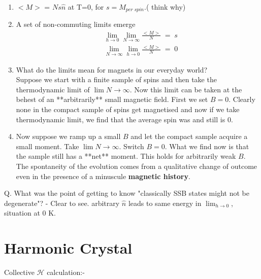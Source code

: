 \documentclass[12pt]{article}
\begin{document}
\begin{enumerate}
    \item  $<M>$ = $Ns\hat{n}$ at T=0, for $s= M_{per\;spin}$.( think why)
    \item  A set of non-commuting limits emerge
        \begin{align*}
              &\lim_{h\to 0}\lim_{N\to \infty} \frac{<M>}{N}\;=\;s\\
              &\lim_{N\to \infty}\lim_{h\to 0} \frac{<M>}{N}\;=\;0
        \end{align*}
    \item What do the limits mean for magnets in our everyday world? \\
    Suppose we start with a finite sample of spins and then take the thermodynamic limit of $\lim{N\to\infty}$. Now this limit can be taken at the behest of an **arbitrarily** small magnetic field. First we set $B=0$. Clearly none in the compact sample of spins get magnetised and now if we take thermodynamic limit, we find that the average spin was and still is 0.
    \item Now suppose we ramp up a small $B$ and let the compact sample acquire a small moment. Take $\lim{N\to\infty}$. Switch $B=0$. What we find now is that the sample still has a **net** moment. This holds for arbitrarily weak $B$. The spontaneity of the evolution comes from a qualitative change of outcome even in the presence of a minuscule \textbf{magnetic history}.
\end{enumerate}
Q. What was the point of getting to know "classically SSB states might not be degenerate"? - Clear to see. arbitrary
$\hat{n}$ leads to same energy in
$\lim_{h\to 0}$, situation at 0 K.

\section{Harmonic Crystal}
Collective $\mathcal{H}$ calculation:-\\
\end{document}
